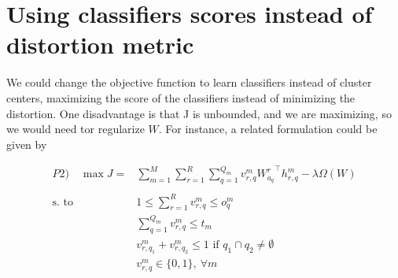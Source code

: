 \documentclass[11pt,letterpaper]{article}
\newcommand{\+}[1]{\ensuremath{{\boldsymbol #1}}}
\begin{document}
\section{Using classifiers scores instead of distortion metric}
We could change the objective function to learn classifiers instead of cluster centers, maximizing the score of the classifiers instead of minimizing the distortion. One disadvantage is that J is unbounded, and we are maximizing, so we would need tor regularize $W$. For instance, a related formulation could be given by

\begin{equation}
\begin{split}
P2)\quad \max J= &\sum_{m=1}^M \sum_{r=1}^R \sum_{q=1}^{Q_m} v_{r,q}^m  {W_{a_q}^r}^\top h_{r,q}^m  - \lambda \Omega(W)\\  \\  \text{s. to} \quad & 1 \le \sum_{r=1}^R v_{r,q}^m \le o_q^m \\ & \sum_{q=1}^{Q_m} v_{r,q}^m \le t_m \\ & v_{r,q_1}^m + v_{r,q_2}^m \le 1 \text{ if } q_1\cap q_2 \neq \emptyset \\  & v_{r,q}^m \in \{0,1\},~\forall m
\end{split}
\end{equation}
\end{document}
